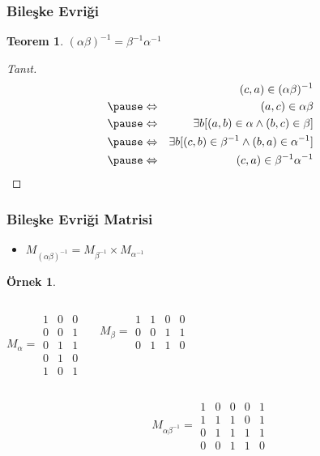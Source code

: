 \documentclass[dvipsnames]{beamer}
\theoremstyle{definition}
\theoremstyle{example}
\newtheorem{ornek}[theorem]{Örnek}
\theoremstyle{plain}
\newtheorem{teorem}[theorem]{Teorem}
\begin{document}
\begin{frame}
  \frametitle{Bileşke Evriği}

  \begin{teorem}
    $(\alpha \beta)^{-1} = \beta^{-1} \alpha^{-1}$
  \end{teorem}

  \pause
  \begin{proof}[Tanıt]
    \begin{eqnarray*}
      &                 & (c,a) \in (\alpha \beta)^{-1}\\\pause
      & \Leftrightarrow & (a,c) \in \alpha \beta\\\pause
      & \Leftrightarrow & \exists b [(a,b) \in \alpha
                              \wedge (b,c) \in \beta]\\\pause
      & \Leftrightarrow & \exists b [(c,b) \in \beta^{-1}
                              \wedge (b,a) \in \alpha^{-1}]\\\pause
      & \Leftrightarrow & (c,a) \in \beta^{-1}\alpha^{-1}
    \end{eqnarray*}
  \end{proof}
\end{frame}

\begin{frame}
  \frametitle{Bileşke Evriği Matrisi}

  \begin{itemize}
    \item $M_{(\alpha \beta)^{-1}} = M_{\beta^{-1}} \times M_{\alpha^{-1}}$
  \end{itemize}

  \pause
  \begin{ornek}
    \begin{columns}
      \[
        M_\alpha =
          \begin{array}{|ccc|}
            1 & 0 & 0\\
            0 & 0 & 1\\
            0 & 1 & 1\\
            0 & 1 & 0\\
            1 & 0 & 1
          \end{array}
      \]

      \[
        M_\beta =
          \begin{array}{|cccc|}
            1 & 1 & 0 & 0\\
            0 & 0 & 1 & 1\\
            0 & 1 & 1 & 0
          \end{array}
      \]
    \end{columns}

    \[
      M_{\alpha \beta^{-1}} =
        \begin{array}{|ccccc|}
          1 & 0 & 0 & 0 & 1\\
          1 & 1 & 1 & 0 & 1\\
          0 & 1 & 1 & 1 & 1\\
          0 & 0 & 1 & 1 & 0
        \end{array}
    \]
  \end{ornek}
\end{frame}
\end{document}
